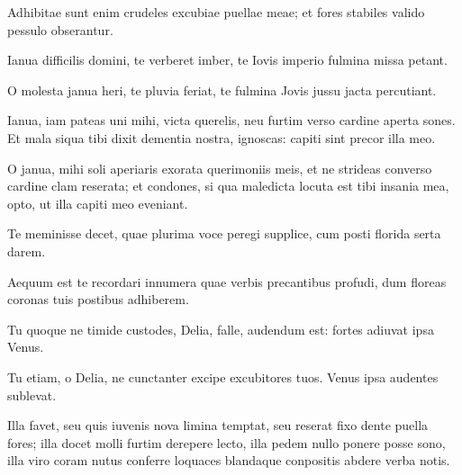 \noindent Adhibitae sunt enim crudeles excubiae puellae meae; et fores stabiles valido pessulo obserantur.\\

{\large

\noindent Ianua difficilis domini, te verberet imber, te Iovis imperio fulmina missa petant.\\

}


\noindent O molesta janua heri, te pluvia feriat, te fulmina Jovis jussu jacta percutiant. \\

{\large

\noindent Ianua, iam pateas uni mihi, victa querelis, neu furtim verso cardine aperta sones. Et mala siqua tibi dixit dementia nostra, ignoscas: capiti sint precor illa meo.\\

}


\noindent O janua, mihi soli aperiaris exorata querimoniis meis, et ne strideas converso cardine clam reserata; et condones, si qua maledicta locuta est tibi insania mea, opto, ut illa capiti meo eveniant. \\



{\large

\noindent Te meminisse decet, quae plurima voce peregi supplice, cum posti florida serta darem.\\

}


\noindent Aequum est te recordari innumera quae verbis precantibus profudi, dum floreas coronas tuis postibus adhiberem. \\

{\large

\noindent Tu quoque ne timide custodes, Delia, falle, audendum est: fortes adiuvat ipsa Venus.\\

}


\noindent Tu etiam, o Delia, ne cunctanter excipe excubitores tuos. Venus ipsa audentes sublevat. \\

{\large

\noindent Illa favet, seu quis iuvenis nova limina temptat, seu reserat fixo dente puella fores; illa docet molli furtim derepere lecto, illa pedem nullo ponere posse sono, illa viro coram nutus conferre loquaces blandaque conpositis abdere verba notis.\\

}


